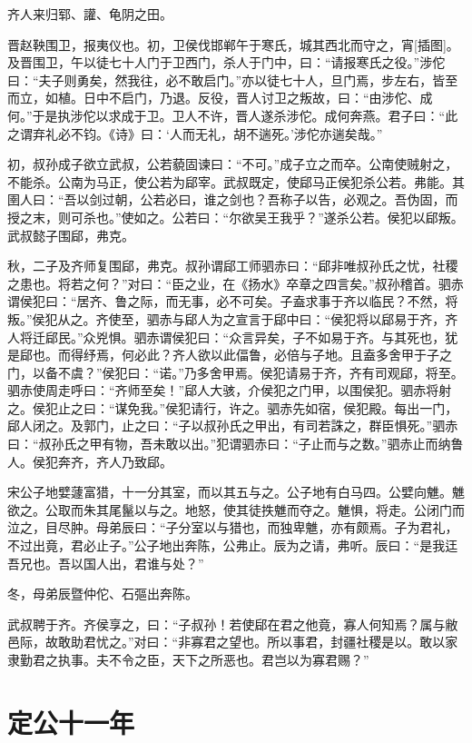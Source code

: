 \documentclass[a4paper,12pt,UTF8,twoside]{ctexbook}
\begin{document}
齐人来归郓、讙、龟阴之田。

晋赵鞅围卫，报夷仪也。初，卫侯伐邯郸午于寒氏，城其西北而守之，宵[插图]。及晋围卫，午以徒七十人门于卫西门，杀人于门中，曰：“请报寒氏之役。”涉佗曰：“夫子则勇矣，然我往，必不敢启门。”亦以徒七十人，旦门焉，步左右，皆至而立，如植。日中不启门，乃退。反役，晋人讨卫之叛故，曰：“由涉佗、成何。”于是执涉佗以求成于卫。卫人不许，晋人遂杀涉佗。成何奔燕。君子曰：“此之谓弃礼必不钧。《诗》曰：‘人而无礼，胡不遄死。’涉佗亦遄矣哉。”

初，叔孙成子欲立武叔，公若藐固谏曰：“不可。”成子立之而卒。公南使贼射之，不能杀。公南为马正，使公若为郈宰。武叔既定，使郈马正侯犯杀公若。弗能。其圉人曰：“吾以剑过朝，公若必曰，谁之剑也？吾称子以告，必观之。吾伪固，而授之末，则可杀也。”使如之。公若曰：“尔欲吴王我乎？”遂杀公若。侯犯以郈叛。武叔懿子围郈，弗克。

秋，二子及齐师复围郈，弗克。叔孙谓郈工师驷赤曰：“郈非唯叔孙氏之忧，社稷之患也。将若之何？”对曰：“臣之业，在《扬水》卒章之四言矣。”叔孙稽首。驷赤谓侯犯曰：“居齐、鲁之际，而无事，必不可矣。子盍求事于齐以临民？不然，将叛。”侯犯从之。齐使至，驷赤与郈人为之宣言于郈中曰：“侯犯将以郈易于齐，齐人将迁郈民。”众兇惧。驷赤谓侯犯曰：“众言异矣，子不如易于齐。与其死也，犹是郈也。而得纾焉，何必此？齐人欲以此偪鲁，必倍与子地。且盍多舍甲于子之门，以备不虞？”侯犯曰：“诺。”乃多舍甲焉。侯犯请易于齐，齐有司观郈，将至。驷赤使周走呼曰：“齐师至矣！”郈人大骇，介侯犯之门甲，以围侯犯。驷赤将射之。侯犯止之曰：“谋免我。”侯犯请行，许之。驷赤先如宿，侯犯殿。每出一门，郈人闭之。及郭门，止之曰：“子以叔孙氏之甲出，有司若誅之，群臣惧死。”驷赤曰：“叔孙氏之甲有物，吾未敢以出。”犯谓驷赤曰：“子止而与之数。”驷赤止而纳鲁人。侯犯奔齐，齐人乃致郈。

宋公子地嬖蘧富猎，十一分其室，而以其五与之。公子地有白马四。公嬖向魋。魋欲之。公取而朱其尾鬣以与之。地怒，使其徒抶魋而夺之。魋惧，将走。公闭门而泣之，目尽肿。母弟辰曰：“子分室以与猎也，而独卑魋，亦有颇焉。子为君礼，不过出竟，君必止子。”公子地出奔陈，公弗止。辰为之请，弗听。辰曰：“是我迋吾兄也。吾以国人出，君谁与处？”

冬，母弟辰暨仲佗、石彄出奔陈。

武叔聘于齐。齐侯享之，曰：“子叔孙！若使郈在君之他竟，寡人何知焉？属与敝邑际，故敢助君忧之。”对曰：“非寡君之望也。所以事君，封疆社稷是以。敢以家隶勤君之执事。夫不令之臣，天下之所恶也。君岂以为寡君赐？”

\section{定公十一年}
\end{document}
